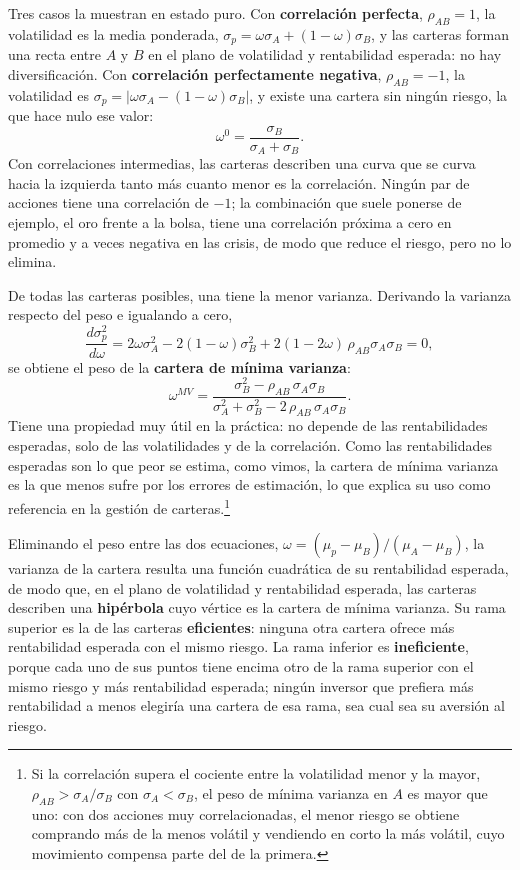 \documentclass[10pt,a4paper]{article}
\begin{document}
Tres casos la muestran en estado puro. Con \textbf{correlación perfecta}, $\rho_{AB}=1$, la volatilidad es la media ponderada, $\sigma_p=\omega\sigma_A+(1-\omega)\sigma_B$, y las carteras forman una recta entre $A$ y $B$ en el plano de volatilidad y rentabilidad esperada: no hay diversificación. Con \textbf{correlación perfectamente negativa}, $\rho_{AB}=-1$, la volatilidad es $\sigma_p=|\omega\sigma_A-(1-\omega)\sigma_B|$, y existe una cartera sin ningún riesgo, la que hace nulo ese valor:
$$\omega^{0}=\frac{\sigma_B}{\sigma_A+\sigma_B}.$$
Con correlaciones intermedias, las carteras describen una curva que se curva hacia la izquierda tanto más cuanto menor es la correlación. Ningún par de acciones tiene una correlación de $-1$; la combinación que suele ponerse de ejemplo, el oro frente a la bolsa, tiene una correlación próxima a cero en promedio y a veces negativa en las crisis, de modo que reduce el riesgo, pero no lo elimina.

De todas las carteras posibles, una tiene la menor varianza. Derivando la varianza respecto del peso e igualando a cero,
$$\frac{d\sigma_p^2}{d\omega}=2\omega\sigma_A^2-2(1-\omega)\sigma_B^2+2(1-2\omega)\,\rho_{AB}\sigma_A\sigma_B=0,$$
se obtiene el peso de la \textbf{cartera de mínima varianza}:
$$\omega^{MV}=\frac{\sigma_B^2-\rho_{AB}\,\sigma_A\sigma_B}{\sigma_A^2+\sigma_B^2-2\,\rho_{AB}\,\sigma_A\sigma_B}.$$
Tiene una propiedad muy útil en la práctica: no depende de las rentabilidades esperadas, solo de las volatilidades y de la correlación. Como las rentabilidades esperadas son lo que peor se estima, como vimos, la cartera de mínima varianza es la que menos sufre por los errores de estimación, lo que explica su uso como referencia en la gestión de carteras.\footnote{%
    Si la correlación supera el cociente entre la volatilidad menor y la mayor, $\rho_{AB}>\sigma_A/\sigma_B$ con $\sigma_A<\sigma_B$, el peso de mínima varianza en $A$ es mayor que uno: con dos acciones muy correlacionadas, el menor riesgo se obtiene comprando más de la menos volátil y vendiendo en corto la más volátil, cuyo movimiento compensa parte del de la primera.
}

Eliminando el peso entre las dos ecuaciones, $\omega=(\mu_p-\mu_B)/(\mu_A-\mu_B)$, la varianza de la cartera resulta una función cuadrática de su rentabilidad esperada, de modo que, en el plano de volatilidad y rentabilidad esperada, las carteras describen una \textbf{hipérbola} cuyo vértice es la cartera de mínima varianza. Su rama superior es la de las carteras \textbf{eficientes}: ninguna otra cartera ofrece más rentabilidad esperada con el mismo riesgo. La rama inferior es \textbf{ineficiente}, porque cada uno de sus puntos tiene encima otro de la rama superior con el mismo riesgo y más rentabilidad esperada; ningún inversor que prefiera más rentabilidad a menos elegiría una cartera de esa rama, sea cual sea su aversión al riesgo.
\end{document}
